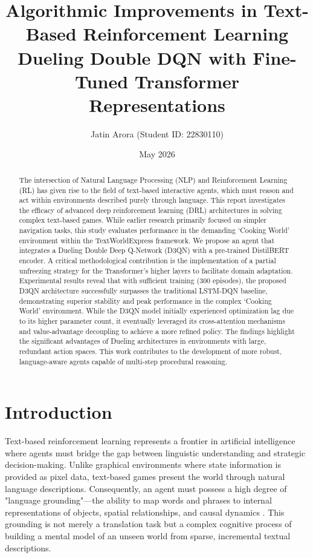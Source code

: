\documentclass[11pt,a4paper]{article}
\title{\textbf{Algorithmic Improvements in Text-Based Reinforcement Learning}\\ \large Dueling Double DQN with Fine-Tuned Transformer Representations}
\author{Jatin Arora (Student ID: 22830110)}
\date{May 2026}
\begin{document}
\maketitle

\begin{abstract}
The intersection of Natural Language Processing (NLP) and Reinforcement Learning (RL) has given rise to the field of text-based interactive agents, which must reason and act within environments described purely through language. This report investigates the efficacy of advanced deep reinforcement learning (DRL) architectures in solving complex text-based games. While earlier research primarily focused on simpler navigation tasks, this study evaluates performance in the demanding `Cooking World' environment within the TextWorldExpress framework. We propose an agent that integrates a Dueling Double Deep Q-Network (D3QN) with a pre-trained DistilBERT encoder. A critical methodological contribution is the implementation of a partial unfreezing strategy for the Transformer's higher layers to facilitate domain adaptation. Experimental results reveal that with sufficient training (300 episodes), the proposed D3QN architecture successfully surpasses the traditional LSTM-DQN baseline, demonstrating superior stability and peak performance in the complex `Cooking World' environment. While the D3QN model initially experienced optimization lag due to its higher parameter count, it eventually leveraged its cross-attention mechanisms and value-advantage decoupling to achieve a more refined policy. The findings highlight the significant advantages of Dueling architectures in environments with large, redundant action spaces. This work contributes to the development of more robust, language-aware agents capable of multi-step procedural reasoning.
\end{abstract}

\section{Introduction}
Text-based reinforcement learning represents a frontier in artificial intelligence where agents must bridge the gap between linguistic understanding and strategic decision-making. Unlike graphical environments where state information is provided as pixel data, text-based games present the world through natural language descriptions. Consequently, an agent must possess a high degree of "language grounding"---the ability to map words and phrases to internal representations of objects, spatial relationships, and causal dynamics \citep{narasimhan2015language}. This grounding is not merely a translation task but a complex cognitive process of building a mental model of an unseen world from sparse, incremental textual descriptions.
\end{document}
